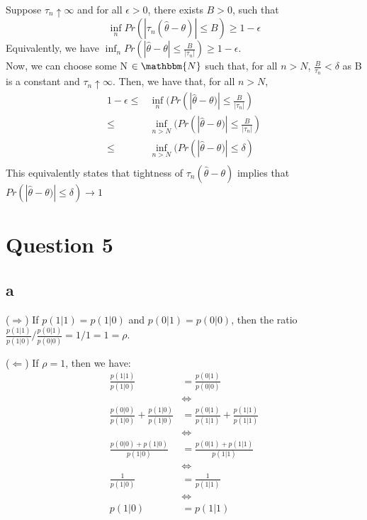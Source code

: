 \documentclass[12pt]{paper}
\begin{document}
Suppose $\tau_n \uparrow \infty$ and for all $\epsilon>0$, there exists $B>0$, such that $$\inf_n Pr(|\tau_n (\hat \theta - \theta)|\leq B) \geq 1-\epsilon $$
Equivalently, we have $\inf_n Pr(|\hat \theta - \theta|\leq \frac{B}{|\tau_n|}) \geq 1-\epsilon$. \\
Now, we can choose some N $\in \mathbbm{N}$ such that, for all $n>N$, $\frac{B}{\tau_n} < \delta $ as B is a constant and $\tau_n \uparrow \infty$. Then, we have that, for all $n>N$,
\begin{align*}
    1-\epsilon \leq & \inf_n(Pr(|\hat \theta - \theta)| \leq \frac{B}{|\tau_n|}) \\
    \leq & \inf_{n>N}(Pr(|\hat \theta - \theta)| \leq \frac{B}{|\tau_n|}) \\
    \leq & \inf_{n>N}(Pr(|\hat \theta - \theta)| \leq \delta) \\
\end{align*}
This equivalently states that tightness of $\tau_n (\hat \theta - \theta)$ implies that \\ $Pr(|\hat \theta - \theta)| \leq \delta) \rightarrow 1$

\section*{Question 5}

\subsection*{a}

($\Longrightarrow$) If $p(1|1)=p(1|0)$ and $p(0|1)=p(0|0)$, then the ratio $\frac{p(1|1)}{p(1|0)}\Big/\frac{p(0|1)}{p(0|0)}=1/1=1=\rho$.

($\Longleftarrow$) If $\rho=1$, then we have:
\begin{equation}
\begin{split}
\frac{p(1|1)}{p(1|0)}&=\frac{p(0|1)}{p(0|0)}\\
&\Longleftrightarrow\\
\frac{p(0|0)}{p(1|0)}+\frac{p(1|0)}{p(1|0)}&=\frac{p(0|1)}{p(1|1)}+\frac{p(1|1)}{p(1|1)}\\
&\Longleftrightarrow\\
\frac{p(0|0)+p(1|0)}{p(1|0)}&=\frac{p(0|1)+p(1|1)}{p(1|1)}\\
&\Longleftrightarrow\\
\frac{1}{p(1|0)}&=\frac{1}{p(1|1)}\\
&\Longleftrightarrow\\
p(1|0) &=p(1|1)\\
\end{split}
\end{equation}
\end{document}
